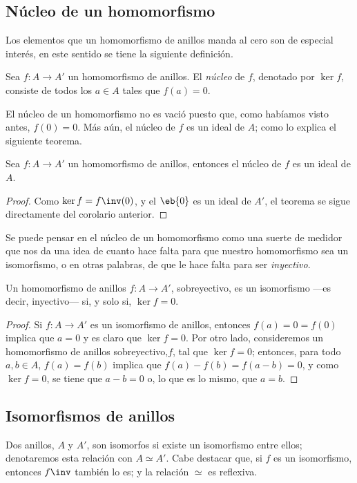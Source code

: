 \subsection{Núcleo de un homomorfismo}
Los elementos que un homomorfismo de anillos manda al cero son de especial interés, en este sentido se tiene la siguiente definición.
\begin{defi}[núcleo]
	Sea $f\colon  A\to A'$ un homomorfismo de anillos. El \textit{núcleo} de $f$, denotado por $\ker f$, consiste de todos los $a\in A$ tales que $f(a)=0$. 
\end{defi}
El núcleo de un homomorfismo no es vació puesto que, como habíamos visto antes, $f(0)=0$. Más aún, el núcleo de $f$ es un ideal de $A$; como lo explica el siguiente teorema.
\begin{teo}
	Sea $f\colon A\to A'$ un homomorfismo de anillos, entonces el núcleo de $f$ es un ideal de $A$.
\end{teo}
\begin{proof}
	Como $\ker f = f\inv(0)$, y el $\eb{0}$ es un ideal de $A'$, el teorema se sigue directamente del corolario anterior.
\end{proof}
Se puede pensar en el núcleo de un homomorfismo como una suerte de medidor que nos da una idea de cuanto hace falta para que nuestro homomorfismo sea un isomorfismo, o en otras palabras, de que le hace falta para ser \textit{inyectivo}.

\begin{teo}
	Un homomorfismo de anillos $f\colon A\to A'$, sobreyectivo, es un isomorfismo ---es decir, inyectivo--- si, y solo si, $\ker f=0$.
\end{teo}
\begin{proof}
	Si $f\colon A\to A'$ es un isomorfismo de anillos, entonces $ f(a) = 0 = f(0) $ implica que $a=0$ y es claro que $\ker f = 0$. Por otro lado, consideremos  un homomorfismo de anillos sobreyectivo,$f$, tal que $\ker f=0$; entonces, para todo $a,b\in A$, $f(a) = f(b)$ implica que $f(a) - f(b) = f(a-b) = 0$, y como $\ker f=0$, se tiene que $a-b=0$ o, lo que es lo mismo, que $a=b$.
\end{proof}
\subsection{Isomorfismos de anillos 	}
Dos anillos, $A$ y $A'$, son isomorfos si existe un isomorfismo entre ellos; denotaremos esta relación con $A \simeq A'$. Cabe destacar que, si $f$ es un isomorfismo, entonces $f\inv$ también lo es; y la relación $\simeq$ es reflexiva.


